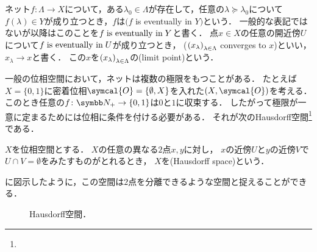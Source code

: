 \documentclass{ltjsbook}
\begin{document}
\begin{thmbox}
\begin{definition}
ネット\(f\colon \Lambda \to X\)について，ある\(\lambda_0 \in \Lambda\)が存在して，任意の\(\lambda \succeq \lambda_0\)について\(f(\lambda) \in Y\)が成り立つとき，\(f\)は\((f\) is eventually in \(Y)\)という．
一般的な表記ではないが以降はこのことを\(f \mathrel{\text{is eventually in}} Y\)と書く．
点\(x \in X\)の任意の開近傍\(U\)について\(f \mathrel{\text{is eventually in}} U\)が成り立つとき，
(\({({x}_\lambda)}_{\lambda \in \Lambda}\) converges to \(x\))といい，\(x_\lambda \to x\)と書く．
この\(x\)を\({({x}_\lambda)}_{\lambda \in \Lambda}\)の(limit point)という．
\end{definition}
\end{thmbox}

一般の位相空間において，ネットは複数の極限をもつことがある．
たとえば\(X = \{0, 1\}\)に密着位相\(\symcal{O} = \{\emptyset, X\}\)を入れた\(\tuple{X, \symcal{O}}\)を考える．
このとき任意の\(f\colon \PositiveInteger \to \{0, 1\}\)は\(0\)と\(1\)に収束する．
したがって極限が一意に定まるためには位相に条件を付ける必要がある．
それが次のHausdorff空間\footnote{}である．

\begin{thmbox}
\begin{definition}
\(X\)を位相空間とする．
\(X\)の任意の異なる\(2\)点\(x, y\)に対し，
\(x\)の近傍\(U\)と\(y\)の近傍\(V\)で\(U \cap V = \emptyset\)をみたすものがとれるとき，
\(X\)を(Hausdorff space)という．
\end{definition}
\end{thmbox}

に図示したように，この空間は\(2\)点を分離できるような空間と捉えることができる．

\begin{figure}
    \centering
    \caption{Hausdorff空間．}
\end{figure}
\end{document}

